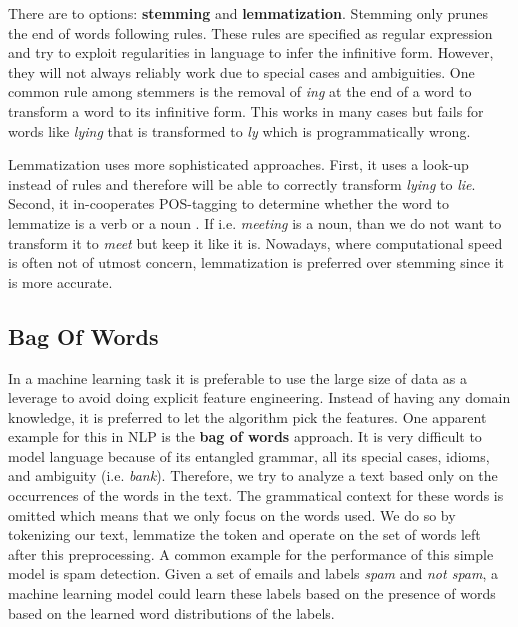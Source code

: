 There are to options: \textbf{stemming} and \textbf{lemmatization}. Stemming only prunes the end of words following rules. These rules are specified as regular expression and try to exploit regularities in language to infer the infinitive form. However, they will not always reliably work due to special cases and ambiguities. One common rule among stemmers is the removal of \textit{ing} at the end of a word to transform a word to its infinitive form. This works in many cases but fails for words like \textit{lying} that is transformed to \textit{ly} which is programmatically wrong.

Lemmatization uses more sophisticated approaches. First, it uses a look-up instead of rules and therefore will be able to correctly transform \textit{lying} to \textit{lie}. Second, it in-cooperates POS-tagging to determine whether the word to lemmatize is a verb or a noun \citep{Muller2015}. If i.e. \textit{meeting} is a noun, than we do not want to transform it to \textit{meet} but keep it like it is. Nowadays, where computational speed is often not of utmost concern, lemmatization is preferred over stemming since it is more accurate\citep{Balakrishnan2014}.


\subsection{Bag Of Words}\label{section:bow}
In a machine learning task it is preferable to use the large size of data as a leverage to avoid doing explicit feature engineering. Instead of having any domain knowledge, it is preferred to let the algorithm pick the features. One apparent example for this in NLP is the \textbf{bag of words} approach. It is very difficult to model language because of its entangled grammar, all its special cases, idioms, and ambiguity (i.e. \textit{bank}). Therefore, we try to analyze a text based only on the occurrences of the words in the text. The grammatical context for these words is omitted which means that we only focus on the words used. We do so by tokenizing our text, lemmatize the token and operate on the set of words left after this preprocessing. A common example for the performance of this simple model is spam detection. Given a set of emails and labels \emph{spam} and \emph{not spam}, a machine learning model could learn these labels based on the presence of words based on the learned word distributions of the labels.

